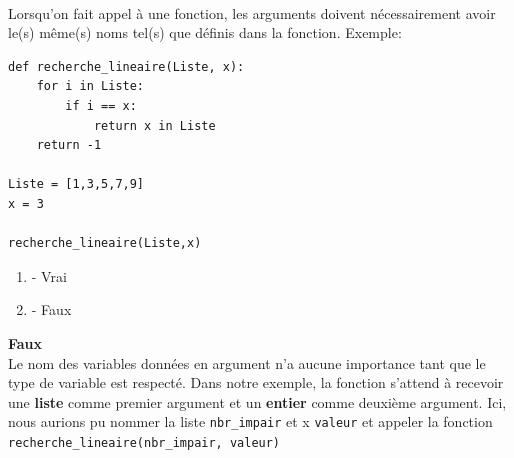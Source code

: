 \begin{Exercice}[2 minutes]\\
Lorsqu'on fait appel à une fonction, les arguments doivent nécessairement avoir le(s) même(s) noms tel(s) que définis dans la fonction. Exemple:\\
\begin{lstlisting}
def recherche_lineaire(Liste, x):
    for i in Liste:
        if i == x:
            return x in Liste
    return -1

Liste = [1,3,5,7,9]
x = 3

recherche_lineaire(Liste,x)

\end{lstlisting}
\begin{enumerate}
    \item - Vrai
    \item - Faux
\end{enumerate}
\begin{solution}
    \textbf{Faux}\\
    Le nom des variables données en argument n'a aucune importance tant que le type de variable est respecté. Dans notre exemple, la fonction s'attend à recevoir  une \textbf{liste} comme premier argument et un \textbf{entier} comme deuxième argument. Ici, nous aurions pu nommer la liste \lstinline{nbr_impair} et x \lstinline{valeur} et appeler la fonction \lstinline{recherche_lineaire(nbr_impair, valeur)}

\end{solution}
\end{Exercice}

